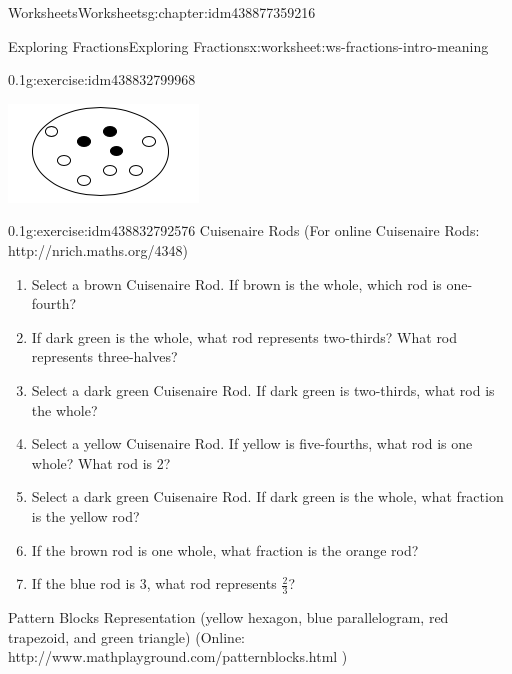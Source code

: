 \documentclass[twoside,11pt,]{book}
\begin{document}
\begin{chapterptx}{Worksheets}{}{Worksheets}{}{}{g:chapter:idm438877359216}
\begin{worksheet-section-numberless}{Exploring Fractions}{}{Exploring Fractions}{}{}{x:worksheet:ws-fractions-intro-meaning}
\begin{divisionexercise}{2}{}{0.1}{g:exercise:idm438832799968}
\begin{enumerate}[label=(\alph*)]
\begin{sidebyside}{1}{0.35}{0.35}{0}
\begin{sbspanel}{0.3}
\includegraphics[width=1\linewidth]{images/counters-one-third.png}
\end{sbspanel}%
\end{sidebyside}%
%
\end{enumerate}
\end{divisionexercise}%
\clearpage
\begin{divisionexercise}{3}{}{0.1}{g:exercise:idm438832792576}%
Cuisenaire Rods (For online Cuisenaire Rods: http:\slash{}\slash{}nrich.maths.org\slash{}4348)%
\leavevmode%
\begin{enumerate}[label=(\alph*)]
\item{}Select a brown Cuisenaire Rod.  If brown is the whole, which rod is one-fourth?%
\item{}If dark green is the whole, what rod represents two-thirds? What rod represents three-halves?%
\item{}Select a dark green Cuisenaire Rod.  If dark green is two-thirds, what rod is the whole?%
\item{}Select a yellow Cuisenaire Rod.  If yellow is five-fourths, what rod is one whole? What rod is 2?%
\item{}Select a dark green Cuisenaire Rod.  If dark green is the whole, what fraction is the yellow rod?%
\item{}If the brown rod is one whole, what fraction is the orange rod?%
\item{}If the blue rod is 3, what rod represents \(\frac{2}{3} \)?%
\end{enumerate}
\end{divisionexercise}%
\begin{introduction}{}%
Pattern Blocks Representation (yellow hexagon, blue parallelogram, red trapezoid, and green triangle) (Online: http:\slash{}\slash{}www.mathplayground.com\slash{}patternblocks.html )%
\end{introduction}%

\end{worksheet-section-numberless}
\end{chapterptx}
\end{document}
